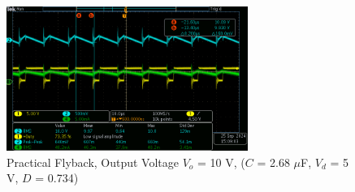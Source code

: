 \documentclass[12pt,twoside]{scrartcl}
\begin{document}
\begin{figure}[htp]
    \centering
    \includegraphics[width=0.7\textwidth]{Flyback/tek0004.png}
    \caption{Practical Flyback, Output Voltage $V_o$ = 10 V, ($C$ = 2.68 $\mu$F, $V_d$ = 5 V, $D$ = 0.734)}
    \label{fig:Practical4}
\end{figure}

\newpage
\end{document}
